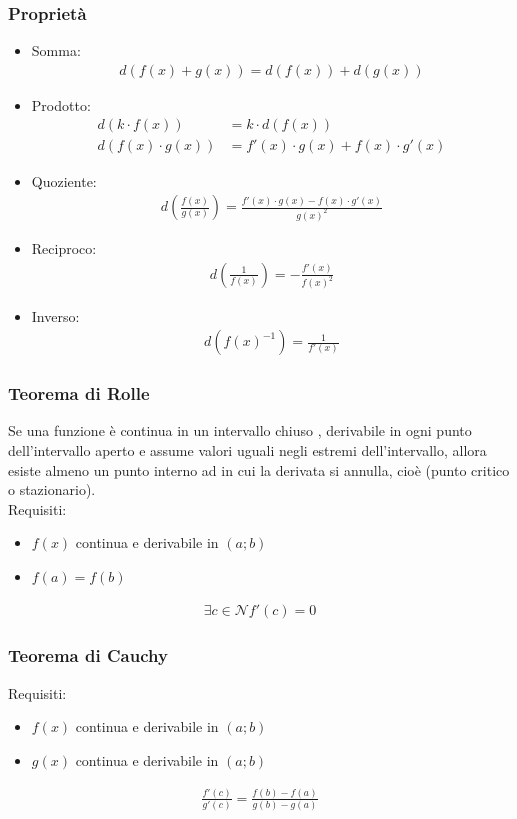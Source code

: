 \documentclass[a4paper]{article}
\begin{document}
	\subsubsection{Proprietà}
	\begin{itemize}
		\item Somma:
		\begin{align*}
			d(f(x) + g(x)) = d(f(x))+d(g(x))
		\end{align*}
		\item  Prodotto:
		\begin{align*}
			d(k \cdot f(x)) &= k \cdot d(f(x))\\
			d(f(x) \cdot g(x)) &= f'(x) \cdot g(x) + f(x) \cdot g'(x)
		\end{align*}
		\item Quoziente:
		\begin{align*}
			d\left( \frac{f(x)}{g(x)} \right) = \frac{f'(x) \cdot g(x) - f(x) \cdot g'(x)}{g(x)^2}
		\end{align*}
		\item Reciproco:
		\begin{align*}
			d\left( \frac{1}{f(x)} \right) = -\frac{f'(x)}{f(x)^2}
		\end{align*}
		\item Inverso:
		\begin{align*}
			d \left( f(x)^{-1} \right) = \frac{1}{f'(x)}
		\end{align*}
	\end{itemize}
\newpage
	\subsubsection{Teorema di Rolle}
	Se una funzione è continua in un intervallo chiuso , derivabile in ogni punto dell'intervallo aperto e assume valori uguali negli estremi dell'intervallo, allora esiste almeno un punto interno ad in cui la derivata si annulla, cioè (punto critico o stazionario).
	\\Requisiti:
	\begin{itemize}
		\item $f(x)$ continua e derivabile in $(a;b)$
		\item $f(a) = f(b)$
	\end{itemize}
	\begin{align*}
		\exists c \in \mathcal{N} f'(c) = 0
	\end{align*}
	\subsubsection{Teorema di Cauchy}
	Requisiti:
	\begin{itemize}
		\item $f(x)$ continua e derivabile in $(a;b)$
		\item $g(x)$ continua e derivabile in $(a;b)$
	\end{itemize}
	\begin{align*}
	\frac{f'(c)}{g'(c)} = \frac{f(b)-f(a)}{g(b)-g(a)}
	\end{align*}
	
\end{document}
